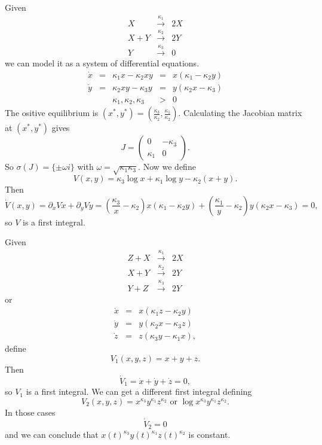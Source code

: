 \documentclass{article}
\newcommand*{\mattwo}[4]{\begin{pmatrix}
    #1&#2\\#3&#4
\end{pmatrix}}
\begin{document}
\begin{exam}
    Given
    $$\begin{array}{rcl}
    X &\stackrel{\kappa_1}{\to}& 2X\\
    X+Y &\stackrel{\kappa_2}{\to}& 2Y\\
    Y &\stackrel{\kappa_3}{\to}& 0
    \end{array}$$
    we can model it as a system of differential equations.
    $$\begin{array}{rcccl}\dot x &=&\kappa_1x-\kappa_2xy &=& x(\kappa_1-\kappa_2y)\\
    \dot y&=&\kappa_2xy-\kappa_3y &=& y(\kappa_2x-\kappa_3)\\
    &&\kappa_1,\kappa_2, \kappa_3 &>& 0
    \end{array}$$
    The ositive equilibrium is $(x^*,y^*)=\left(\frac{\kappa_3}{\kappa_2},\frac{\kappa_1}{\kappa_2}\right)$. Calculating the Jacobian matrix at $(x^*, y^*)$ gives
    $$J = \mattwo0{-\kappa_3}{\kappa_1}0.$$
    So $\sigma(J)=\{\pm\omega i\}$ with $\omega = \sqrt{\kappa_1\kappa_3}$. Now we define
    $$V(x,y)=\kappa_3\log x + \kappa_1\log y-\kappa_2(x+y).$$
    Then
    $$\dot V(x,y) = \partial_xV\dot x+\partial_y V\dot y = \left(\frac{\kappa_3}{x}-\kappa_2\right)x(\kappa_1-\kappa_2y)+\left(\frac{\kappa_1}{y}-\kappa_2\right)y(\kappa_2x-\kappa_3) = 0,$$
    so $V$ is a first integral.
\end{exam}

\begin{exam}
    Given
    $$\begin{array}{rcl}Z+X &\stackrel{\kappa_1}{\to}& 2X\\
    X+Y &\stackrel{\kappa_2}{\to}& 2Y\\
    Y+Z &\stackrel{\kappa_3}{\to}& 2Y
    \end{array}$$
    or
    $$\begin{array}{rcl}\dot x &=& x(\kappa_1z - \kappa_2y)\\
    \dot y &=& y(\kappa_2x - \kappa_3z)\\
    \dot z &=& z(\kappa_3y - \kappa_1x),\end{array}$$
    define
    $$V_1(x,y,z) = x+y+z.$$
    Then
    $$\dot V_1=\dot x+\dot y+\dot z = 0,$$
    so $V_1$ is a first integral. We can get a different first integral defining
    $$V_2(x,y,z) = x^{\kappa_3}y^{\kappa_1}z^{\kappa_2} \text{ or } \log x^{\kappa_3}y^{\kappa_1}z^{\kappa_2}.$$
    In those cases
    $$\dot V_2=0$$
    and we can conclude that $x(t)^{\kappa_3}y(t)^{\kappa_1}z(t)^{\kappa_2}$ is constant.
\end{exam}
\end{document}
